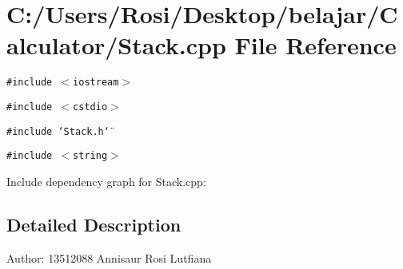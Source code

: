 \section{C:/Users/Rosi/Desktop/belajar/Calculator/Stack.cpp File Reference}
\label{_stack_8cpp}
{\tt \#include $<$iostream$>$}\par
{\tt \#include $<$cstdio$>$}\par
{\tt \#include \char`\"{}Stack.h\char`\"{}}\par
{\tt \#include $<$string$>$}\par


Include dependency graph for Stack.cpp:

\subsection{Detailed Description}
\begin{Desc}
\item[Author:]13512088 Annisaur Rosi Lutfiana \end{Desc}
